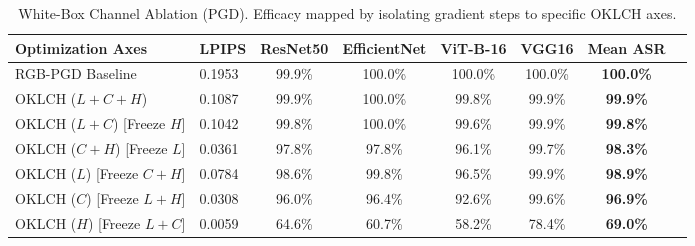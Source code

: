 \begin{table}[htbp]
\centering
\caption{White-Box Channel Ablation (PGD). Efficacy mapped by isolating gradient steps to specific OKLCH axes.}
\label{tab:channel_ablation}
\begin{adjustbox}{max width=\linewidth}
\begin{tabular}{@{}llcccccc@{}}
\toprule
\textbf{Optimization Axes} & \textbf{LPIPS} & \textbf{ResNet50} & \textbf{EfficientNet} & \textbf{ViT-B-16} & \textbf{VGG16} & \textbf{Mean ASR} \\ \midrule
RGB-PGD Baseline & 0.1953 & 99.9\% & 100.0\% & 100.0\% & 100.0\% & \textbf{100.0\%} \\
OKLCH ($L+C+H$) & 0.1087 & 99.9\% & 100.0\% & 99.8\% & 99.9\% & \textbf{99.9\%} \\
OKLCH ($L+C$) [Freeze $H$] & 0.1042 & 99.8\% & 100.0\% & 99.6\% & 99.9\% & \textbf{99.8\%} \\
OKLCH ($C+H$) [Freeze $L$] & 0.0361 & 97.8\% & 97.8\% & 96.1\% & 99.7\% & \textbf{98.3\%} \\
OKLCH ($L$) [Freeze $C+H$] & 0.0784 & 98.6\% & 99.8\% & 96.5\% & 99.9\% & \textbf{98.9\%} \\
OKLCH ($C$) [Freeze $L+H$] & 0.0308 & 96.0\% & 96.4\% & 92.6\% & 99.6\% & \textbf{96.9\%} \\
OKLCH ($H$) [Freeze $L+C$] & 0.0059 & 64.6\% & 60.7\% & 58.2\% & 78.4\% & \textbf{69.0\%} \\
\bottomrule
\end{tabular}
\end{adjustbox}
\end{table}
